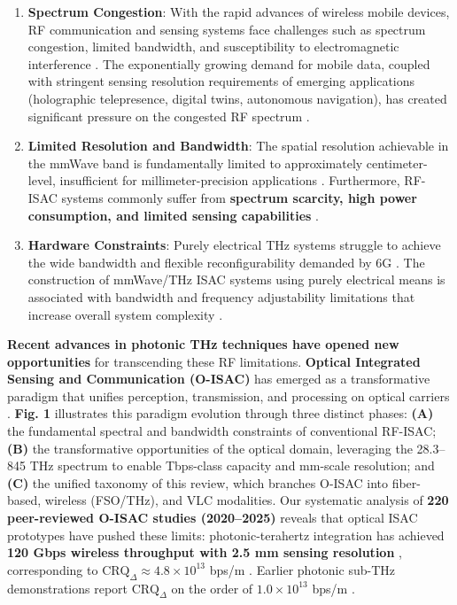 \begin{enumerate}
    \item \textbf{Spectrum Congestion}: With the rapid advances of wireless mobile devices, RF communication and sensing systems face challenges such as spectrum congestion, limited bandwidth, and susceptibility to electromagnetic interference \cite{O_ISAC_068}. The exponentially growing demand for mobile data, coupled with stringent sensing resolution requirements of emerging applications (holographic telepresence, digital twins, autonomous navigation), has created significant pressure on the congested RF spectrum \cite{O_ISAC_161}.
    \item \textbf{Limited Resolution and Bandwidth}: The spatial resolution achievable in the mmWave band is fundamentally limited to approximately centimeter-level, insufficient for millimeter-precision applications \cite{O_ISAC_021}. Furthermore, RF-ISAC systems commonly suffer from \textbf{spectrum scarcity, high power consumption, and limited sensing capabilities} \cite{O_ISAC_203}.
    \item \textbf{Hardware Constraints}: Purely electrical THz systems struggle to achieve the wide bandwidth and flexible reconfigurability demanded by 6G \cite{O_ISAC_070}. The construction of mmWave/THz ISAC systems using purely electrical means is associated with bandwidth and frequency adjustability limitations that increase overall system complexity \cite{O_ISAC_286}.
\end{enumerate}

\textbf{Recent advances in photonic THz techniques have opened new opportunities} for transcending these RF limitations. \textbf{Optical Integrated Sensing and Communication (O-ISAC)} has emerged as a transformative paradigm that unifies perception, transmission, and processing on optical carriers \cite{O_ISAC_021}. \textbf{Fig. 1} illustrates this paradigm evolution through three distinct phases: \textbf{(A)} the fundamental spectral and bandwidth constraints of conventional RF-ISAC; \textbf{(B)} the transformative opportunities of the optical domain, leveraging the 28.3--845 THz spectrum to enable Tbps-class capacity and mm-scale resolution; and \textbf{(C)} the unified taxonomy of this review, which branches O-ISAC into fiber-based, wireless (FSO/THz), and VLC modalities. Our systematic analysis of \textbf{220 peer-reviewed O-ISAC studies (2020--2025)} reveals that optical ISAC prototypes have pushed these limits: photonic-terahertz integration has achieved \textbf{120 Gbps wireless throughput with 2.5 mm sensing resolution} \cite{O_ISAC_105}, corresponding to $\text{CRQ}_{\Delta} \approx 4.8\times10^{13}$ bps/m \cite{O_ISAC_105}. Earlier photonic sub-THz demonstrations report $\text{CRQ}_{\Delta}$ on the order of $1.0\times10^{13}$ bps/m \cite{O_ISAC_016}.

